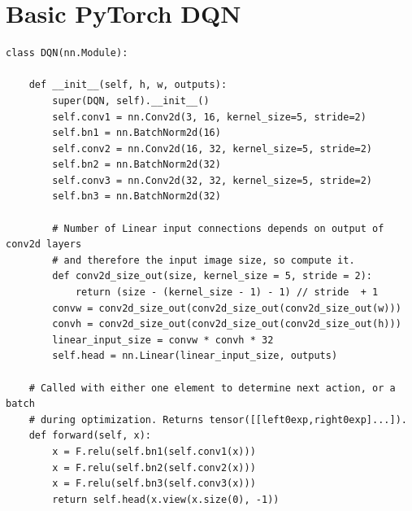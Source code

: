 \documentclass[12pt]{article}
\begin{document}
\section{Basic PyTorch DQN}
\label{dqnNN}
\begin{verbatim}
class DQN(nn.Module):

    def __init__(self, h, w, outputs):
        super(DQN, self).__init__()
        self.conv1 = nn.Conv2d(3, 16, kernel_size=5, stride=2)
        self.bn1 = nn.BatchNorm2d(16)
        self.conv2 = nn.Conv2d(16, 32, kernel_size=5, stride=2)
        self.bn2 = nn.BatchNorm2d(32)
        self.conv3 = nn.Conv2d(32, 32, kernel_size=5, stride=2)
        self.bn3 = nn.BatchNorm2d(32)

        # Number of Linear input connections depends on output of conv2d layers
        # and therefore the input image size, so compute it.
        def conv2d_size_out(size, kernel_size = 5, stride = 2):
            return (size - (kernel_size - 1) - 1) // stride  + 1
        convw = conv2d_size_out(conv2d_size_out(conv2d_size_out(w)))
        convh = conv2d_size_out(conv2d_size_out(conv2d_size_out(h)))
        linear_input_size = convw * convh * 32
        self.head = nn.Linear(linear_input_size, outputs)

    # Called with either one element to determine next action, or a batch
    # during optimization. Returns tensor([[left0exp,right0exp]...]).
    def forward(self, x):
        x = F.relu(self.bn1(self.conv1(x)))
        x = F.relu(self.bn2(self.conv2(x)))
        x = F.relu(self.bn3(self.conv3(x)))
        return self.head(x.view(x.size(0), -1))
\end{verbatim}
\end{document}
